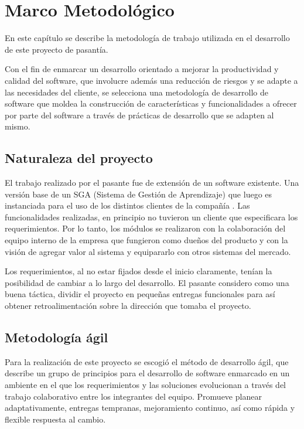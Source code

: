 ﻿\chapter{Marco Metodológico}
\thispagestyle{empty} %

En este capítulo se describe la metodología de trabajo utilizada en el desarrollo de este proyecto de pasantía.

Con el fin de enmarcar un desarrollo orientado a mejorar la productividad y calidad del software, que involucre además una reducción de riesgos y se adapte a las necesidades del cliente, se selecciona una metodología de desarrollo de software que moldea la construcción de características y funcionalidades a ofrecer por parte del software a través de prácticas de desarrollo que se adapten al mismo.

\section{Naturaleza del proyecto}
El trabajo realizado por el pasante fue de extensión de un software existente. Una versión base de un SGA (Sistema de Gestión de Aprendizaje) que luego es instanciada para el uso de los distintos clientes de la compañía
. Las funcionalidades realizadas, en principio no tuvieron un cliente que especificara los requerimientos. Por lo tanto, los módulos se realizaron con la colaboración del equipo interno de la empresa que fungieron como dueños del producto y con la visión de agregar valor al sistema y equipararlo con otros sistemas del mercado.

Los requerimientos, al no estar fijados desde el inicio claramente, tenían la posibilidad de cambiar a lo largo del desarrollo. El pasante considero como una buena táctica, dividir el proyecto en pequeñas entregas funcionales para así obtener retroalimentación sobre la dirección que tomaba el proyecto.

\section{Metodología ágil}

Para la realización de este proyecto se escogió el método de desarrollo ágil, que describe un grupo de principios para el desarrollo de software enmarcado en un ambiente en el que los requerimientos y las soluciones evolucionan a través del trabajo colaborativo entre los integrantes del equipo. Promueve planear adaptativamente, entregas tempranas, mejoramiento continuo, así como rápida y flexible respuesta al cambio.

